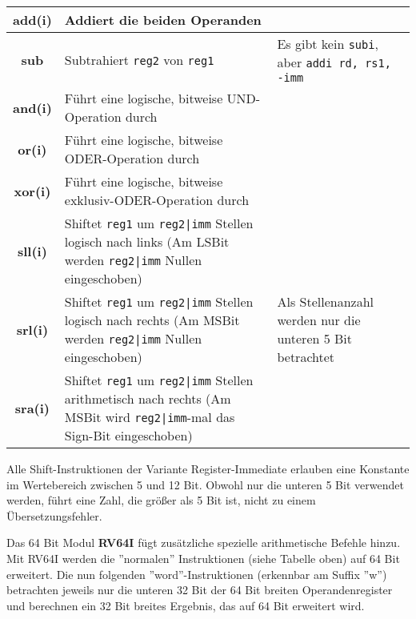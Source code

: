 \begin{tabular}{|c|p{8cm}|p{4cm}|}
	\hline
	\textbf{add(i)} & Addiert die beiden Operanden & \\
	\hline
	\textbf{sub} & Subtrahiert \texttt{reg2} von \texttt{reg1}& Es gibt kein \texttt{subi}, aber \texttt{addi rd, rs1, -imm} \\
	\hline
	\textbf{and(i)} & Führt eine logische, bitweise UND-Operation durch & \\
	\hline
	\textbf{or(i)} & Führt eine logische, bitweise ODER-Operation durch & \\
	\hline
	\textbf{xor(i)} & Führt eine logische, bitweise exklusiv-ODER-Operation durch & \\
	\hline
	\textbf{sll(i)} & Shiftet \texttt{reg1} um \texttt{reg2|imm} Stellen logisch nach links (Am LSBit werden \texttt{reg2|imm} Nullen eingeschoben) & \multirow{3}{4cm}{Als Stellenanzahl werden nur die unteren 5 Bit betrachtet} \\
	\cline{1-2}
	\textbf{srl(i)} & Shiftet \texttt{reg1} um \texttt{reg2|imm} Stellen logisch nach rechts (Am MSBit werden \texttt{reg2|imm} Nullen eingeschoben) & \\
	\cline{1-2}
	\textbf{sra(i)} & Shiftet \texttt{reg1} um \texttt{reg2|imm} Stellen arithmetisch nach rechts (Am MSBit wird \texttt{reg2|imm}-mal das Sign-Bit eingeschoben) & \\
	\hline
\end{tabular}

\begin{warningblock}
Alle Shift-Instruktionen der Variante Register-Immediate erlauben eine
Konstante im Wertebereich zwischen 5 und 12 Bit. Obwohl nur die unteren 5 Bit
verwendet werden, führt eine Zahl, die größer als 5 Bit ist, nicht zu einem
Übersetzungsfehler.
\end{warningblock}

Das 64 Bit Modul \textbf{RV64I} fügt zusätzliche spezielle arithmetische Befehle
hinzu. Mit RV64I werden die ''normalen'' Instruktionen (siehe Tabelle oben) auf
64 Bit erweitert. Die nun folgenden ''word''-Instruktionen (erkennbar am Suffix
''w'') betrachten jeweils nur die unteren 32 Bit der 64 Bit breiten
Operandenregister und berechnen ein 32 Bit breites Ergebnis, das auf 64 Bit
erweitert wird.\\

